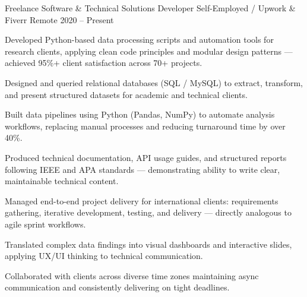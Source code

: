 

\begin{cventries}

  \cventry
    {Freelance Software \& Technical Solutions Developer} %
    {Self-Employed / Upwork \& Fiverr} %
    {Remote} %
    {2020 -- Present} %
    {
      \begin{cvitems}
        \item {Developed Python-based data processing scripts and automation tools for research clients, applying clean code principles and modular design patterns — achieved 95\%+ client satisfaction across 70+ projects.}
        \item {Designed and queried relational databases (SQL / MySQL) to extract, transform, and present structured datasets for academic and technical clients.}
        \item {Built data pipelines using Python (Pandas, NumPy) to automate analysis workflows, replacing manual processes and reducing turnaround time by over 40\%.}
        \item {Produced technical documentation, API usage guides, and structured reports following IEEE and APA standards — demonstrating ability to write clear, maintainable technical content.}
        \item {Managed end-to-end project delivery for international clients: requirements gathering, iterative development, testing, and delivery — directly analogous to agile sprint workflows.}
        \item {Translated complex data findings into visual dashboards and interactive slides, applying UX/UI thinking to technical communication.}
        \item {Collaborated with clients across diverse time zones maintaining async communication and consistently delivering on tight deadlines.}
      \end{cvitems}
    }

\end{cventries}
